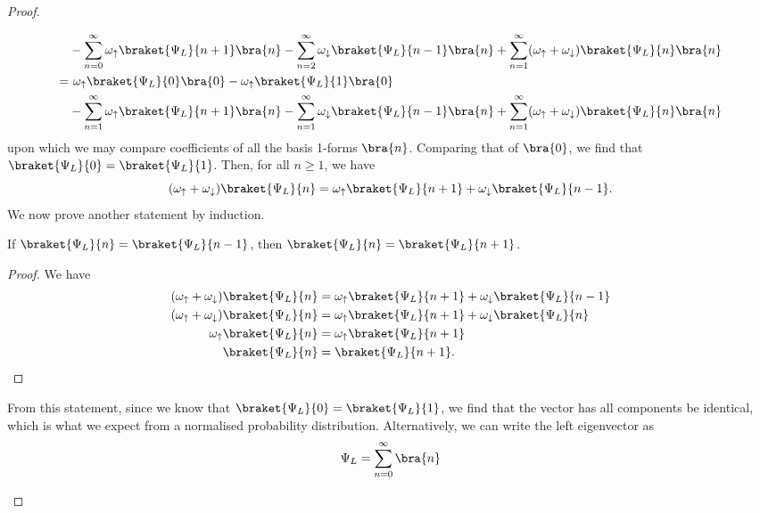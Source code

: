 \begin{proof}
\begin{parts}
\begin{align*}
			 &-\sum_{n=0}^{\infty} \omega_\uparrow \braket{\Psi_L}{n+1}\bra{n}-\sum_{n=2}^{\infty} \omega_\downarrow \braket{\Psi_L}{n-1}\bra{n}+\sum_{n=1}^{\infty} (\omega_\uparrow+\omega_\downarrow)\braket{\Psi_L}{n}\bra{n}  \\
			=&~\omega_\uparrow \braket{\Psi_L}{0}\bra{0}-\omega_\uparrow \braket{\Psi_L}{1}\bra{0}\\
			 &-\sum_{n=1}^{\infty} \omega_\uparrow \braket{\Psi_L}{n+1}\bra{n}-\sum_{n=1}^{\infty} \omega_\downarrow \braket{\Psi_L}{n-1}\bra{n}+\sum_{n=1}^{\infty} (\omega_\uparrow+\omega_\downarrow)\braket{\Psi_L}{n}\bra{n}  
		\end{align*}
		upon which we may compare coefficients of all the basis 1-forms $\bra{n}$. Comparing that of $\bra{0}$, we find that $\braket{\Psi_L}{0}=\braket{\Psi_L}{1}$. Then, for all $n\ge 1$, we have 
		\[
			(\omega_\uparrow+\omega_\downarrow)\braket{\Psi_L}{n} = \omega_\uparrow \braket{\Psi_L}{n+1} + \omega_\downarrow \braket{\Psi_L}{n-1}
		.\] 
		We now prove another statement by induction.
		\begin{tcolorbox}
			\begin{Lemma}
				If $\braket{\Psi_L}{n}=\braket{\Psi_L}{n-1}$, then $\braket{\Psi_L}{n}=\braket{\Psi_L}{n+1}$.
			\end{Lemma}
			\begin{proof}
				We have
				\begin{align*}
					(\omega_\uparrow+\omega_\downarrow)\braket{\Psi_L}{n} &= \omega_\uparrow \braket{\Psi_L}{n+1} + \omega_\downarrow \braket{\Psi_L}{n-1}\\
					(\omega_\uparrow+\omega_\downarrow)\braket{\Psi_L}{n} &= \omega_\uparrow \braket{\Psi_L}{n+1} + \omega_\downarrow \braket{\Psi_L}{n}\\
					\omega_\uparrow\braket{\Psi_L}{n} &= \omega_\uparrow \braket{\Psi_L}{n+1}\\ 
					\braket{\Psi_L}{n} &= \braket{\Psi_L}{n+1}.\qedhere 
				\end{align*}
			\end{proof}
		\end{tcolorbox}
		From this statement, since we know that $\braket{\Psi_L}{0}=\braket{\Psi_L}{1}$, we find that the vector has all components be identical, which is what we expect from a normalised probability distribution. Alternatively, we can write the left eigenvector as
		\[\Psi_L= \sum_{n=0}^\infty \bra{n}\]


\end{parts}
\end{proof}
